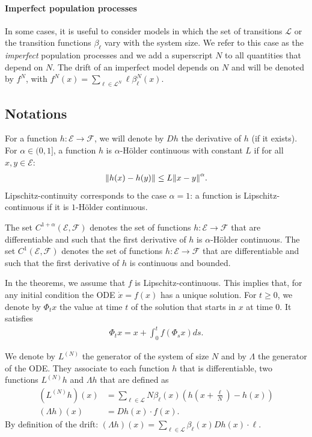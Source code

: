 \documentclass[acmlarge]{acmart}
\newcommand\LN{L^{(N)}}
\newcommand\E{\mathcal{E}}
\newcommand\calL{\mathcal{L}}
\newcommand\calF{\mathcal{F}}
\newcommand\norm[1]{{\mathchoice{\bnorm{#1}}{\snorm{#1}}{\snorm{#1}}{\snorm{#1}}}}
\newcommand\bnorm[1]{\left\|#1\right\|}
\newcommand\snorm[1]{\|#1\|}
\begin{document}
\paragraph*{Imperfect population processes}

In some cases, it is useful to consider models in which the set of
transitions $\calL$ or the transition functions $\beta_\ell$ vary with
the system size. We refer to this case as the \emph{imperfect}
population processes and we add a superscript $N$ to all quantities
that depend on $N$. The drift of an imperfect model depends on $N$ and
will be denoted by $f^N$, with
$f^N(x) = \sum_{\ell\in\calL^N}\ell\beta^N_{\ell}(x)$. 



\subsection{Notations}


For a function $h:\E\to\calF$, we will denote by $Dh$ the derivative
of $h$ (if it exists). For $\alpha\in(0,1]$, a function $h$ is
$\alpha$-Hölder continuous with constant $L$ if for all $x,y\in\E$:
\begin{align*}
  \norm{h(x)-h(y)}\le L\norm{x-y}^\alpha. 
\end{align*} 
Lipschitz-continuity corresponds to the case $\alpha=1$: a function is
Lipschitz-continuous if it is $1$-Hölder continuous.

The set $C^{1+\alpha}(\E,\calF)$ denotes the set of functions
$h:\E\to\calF$ that are differentiable and such that the first
derivative of $h$ is $\alpha$-Hölder continuous.  The set
$C^1(\E,\calF)$ denotes the set of functions $h:\E\to\calF$ that are
differentiable and such that the first derivative of $h$ is
continuous and bounded.

In the theorems, we assume that $f$ is Lipschitz-continuous. This
implies that, for any initial condition the ODE $\dot{x}=f(x)$ has a
unique solution. For $t\ge0$, we denote by $\Phi_tx$ the value at time
$t$ of the solution that starts in $x$ at time $0$. It satisfies
\begin{align*}
  \Phi_tx = x + \int_0^t f(\Phi_sx)ds. 
\end{align*}

We denote by $\LN$ the generator of the system of size $N$ and by
$\Lambda$ the generator of the ODE. They associate to each function
$h$ that is differentiable, two functions $\LN h$ and $\Lambda h$ that
are defined as 
\begin{align*}
  (\LN h) (x) &= \sum_{\ell\in\calL} N\beta_\ell(x) ( h(x+\frac{\ell}{N})-h(x) )\\
  (\Lambda h) (x) &= D h(x) \cdot f(x).
\end{align*}
By definition of the drift:
$(\Lambda h)(x)=\sum_{\ell\in\calL} \beta_\ell(x) D h(x) \cdot \ell$.
\end{document}
